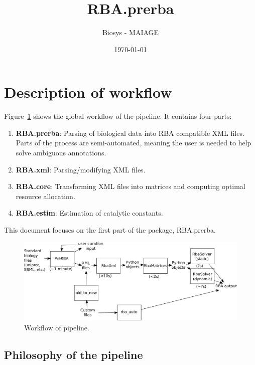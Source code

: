 \documentclass[12pt]{scrartcl}
\newcommand\reft[3][]{#2~\ref{#3}#1}
\theoremstyle{definition}
\theoremstyle{remark}
\numberwithin{equation}{section}
\newcommand\reffigt[2][]{\reft[#1]{Figure}{#2}}
\begin{document}
\title{RBA.prerba}%
\author{Biosys - MAIAGE}%
\date{\today}%

\maketitle

\newpage

\tableofcontents

\newpage

\section{Description of workflow}

\reffigt{fig:workflow} shows the global workflow of the pipeline. It contains four parts:
\begin{enumerate}
\item \textbf{RBA.prerba}: Parsing of biological data into RBA compatible XML files. Parts of the process are semi-automated, meaning the user is needed to help solve ambiguous annotations.
\item \textbf{RBA.xml}: Parsing/modifying XML files.
\item \textbf{RBA.core}: Transforming XML files into matrices and computing optimal resource allocation.
\item \textbf{RBA.estim}: Estimation of catalytic constants.
\end{enumerate}
This document focuses on the first part of the package, RBA.prerba.

\begin{figure}[ht]
  \centering
  \includegraphics[width=\linewidth]{workflow}
  \caption{Workflow of pipeline.}
  \label{fig:workflow}
\end{figure}

\subsection{Philosophy of the pipeline}
\end{document}
